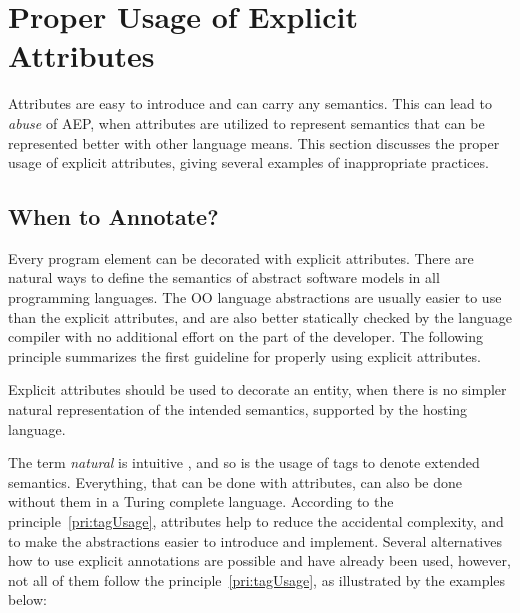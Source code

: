 \section{Proper Usage of Explicit Attributes}
\label{sec.attribute.usage}

Attributes are easy to introduce and can carry any semantics. This can lead to \textit{abuse} of AEP, when attributes are utilized to represent semantics that can be represented better with other language means. This section discusses the proper usage of explicit attributes, giving several examples of inappropriate practices.

\subsection{When to Annotate?}

Every program element can be decorated with explicit attributes. There are natural ways to define the semantics of abstract software models in all programming languages. The OO language abstractions are usually easier to use than the explicit attributes, and are also better statically checked by the language compiler with no additional effort on the part of the developer. The following principle summarizes the first guideline for properly using explicit attributes.  

\begin{principle}
\label{pri:tagUsage}
Explicit attributes should be used to decorate an entity, when there is no simpler natural representation of the intended semantics, supported by the hosting language.
\end{principle}

\noindent The term \textit{natural} is intuitive \cite{mozart.04}, and so is the usage of tags to denote extended semantics. Everything, that can be done with attributes, can also be done without them in a Turing complete \cite{automata.2001} language. According to the principle~\ref{pri:tagUsage}, attributes help to reduce the accidental complexity, and to make the abstractions easier to introduce and implement. Several alternatives how to use explicit annotations are possible and have already been used, however, not all of them follow the principle~\ref{pri:tagUsage}, as illustrated by the examples below:

